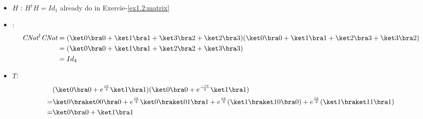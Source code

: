 \begin{itemize}
  \item $H$ : $H^\dagger H = Id_1$ already do in Exercie-\ref{ex1.2:matrix}
  \item \CNot :
    \begin{align*}
      \CNot^\dagger \CNot &= 
        (\ket 0 \bra 0+\ket 1 \bra 1+\ket 3 \bra 2+\ket 2 \bra 3)
        (\ket 0 \bra 0+\ket 1 \bra 1+\ket 2 \bra 3+\ket 3 \bra 2) \\
        &=(\ket 0 \bra 0 + \ket 1 \bra 1 + \ket 2 \bra 2 + \ket 3 \bra 3) \\
        &= Id_4
    \end{align*}
  \item $T$:
    \begin{align*}
      &(\ket 0 \bra 0 + e^{\frac{i\pi}{4}} \ket 1 \bra 1)
       (\ket 0 \bra 0 + e^{\frac{-i\pi}{4}} \ket 1 \bra 1) \\
      =& \ket 0 \braket 0 0 \bra 0 + e^{\frac{i\pi}{4}} \ket 0 \braket 0 1 \bra 1
          + e^{\frac{i\pi}{4}}(\ket 1 \braket 1 0 \bra 0)
          + e^{\frac{i\pi}{2}}(\ket 1 \braket 1 1 \bra 1)\\
      =& \ket 0 \bra 0 + \ket 1 \bra 1
    \end{align*}
\end{itemize}

~

